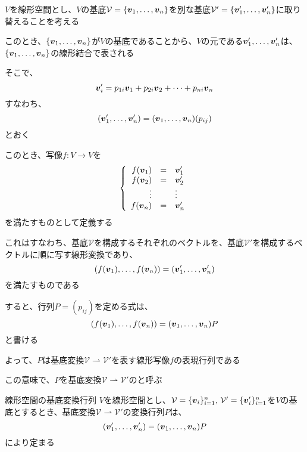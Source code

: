\documentclass[../../../topic_linear-algebra]{subfiles}
\begin{document}
$V$を線形空間とし、$V$の基底$\mathcal{V} = \{\vb*{v}_1, \ldots, \vb*{v}_n\}$を別な基底$\mathcal{V}' = \{\vb*{v}'_1, \ldots, \vb*{v}'_n\}$に取り替えることを考える

\br

このとき、$\{\vb*{v}_1, \ldots, \vb*{v}_n\}$が$V$の基底であることから、$V$の元である$\vb*{v}'_1, \ldots, \vb*{v}'_n$は、$\{\vb*{v}_1, \ldots, \vb*{v}_n\}$の線形結合で表される

そこで、
\begin{equation*}
  \vb*{v}'_i = p_{1i} \vb*{v}_1 + p_{2i} \vb*{v}_2 + \cdots + p_{ni} \vb*{v}_n
\end{equation*}
すなわち、
\begin{equation*}
  (\vb*{v}'_1, \ldots, \vb*{v}'_n) = (\vb*{v}_1, \ldots, \vb*{v}_n) (p_{ij})
\end{equation*}
とおく

\br

このとき、写像$f\colon V \to V$を
\begin{equation*}
  \left\{
  \begin{array}{rcl}
    f(\vb*{v}_1) & = & \vb*{v}'_1 \\
    f(\vb*{v}_2) & = & \vb*{v}'_2 \\
    \vdots       &   & \vdots     \\
    f(\vb*{v}_n) & = & \vb*{v}'_n
  \end{array}
  \right.
\end{equation*}
を満たすものとして定義する

これはすなわち、基底$\mathcal{V}$を構成するそれぞれのベクトルを、基底$\mathcal{V}'$を構成するベクトルに順に写す線形変換であり、
\begin{equation*}
  (f(\vb*{v}_1), \ldots, f(\vb*{v}_n) ) = (\vb*{v}'_1, \ldots, \vb*{v}'_n)
\end{equation*}
を満たすものである

\br

すると、行列$P = (p_{ij})$を定める式は、
\begin{equation*}
  (f(\vb*{v}_1), \ldots, f(\vb*{v}_n)) = (\vb*{v}_1, \ldots, \vb*{v}_n) P
\end{equation*}
と書ける

よって、$P$は基底変換$\mathcal{V} \rightharpoonup \mathcal{V}'$を表す線形写像$f$の表現行列である

この意味で、$P$を基底変換$\mathcal{V} \rightharpoonup \mathcal{V}'$のと呼ぶ

\begin{theorem}{線形空間の基底変換行列}
  $V$を線形空間とし、$\mathcal{V} = \{\vb*{v}_i\}_{i=1}^n,\, \mathcal{V}' = \{\vb*{v}'_i\}_{i=1}^n$を$V$の基底とするとき、基底変換$\mathcal{V} \rightharpoonup \mathcal{V}'$の変換行列$P$は、
  \begin{equation*}
    (\vb*{v}'_1, \ldots, \vb*{v}'_n) = (\vb*{v}_1, \ldots, \vb*{v}_n) P
  \end{equation*}
  により定まる
\end{theorem}
\end{document}

